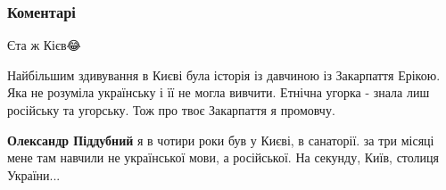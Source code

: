  
 
 
 
 
\subsubsection{Коментарі}
\label{sec:02_08_2021.fb.piddubnyj_aleksandr.1.dobryj_den_aleksandr.cmt}

\begin{itemize}
 
Єта ж Кієв😂

\begin{itemize}
 

Найбільшим здивування в Києві була історія із давчиною із Закарпаття Ерікою.
Яка не розуміла українську і її не могла вивчити. Етнічна угорка - знала лиш
російську та угорську. Тож про твоє Закарпаття я промовчу.


 
\textbf{Олександр Піддубний} я в чотири роки був у Києві, в санаторії. за три
місяці мене там навчили не української мови, а російської. На секунду, Київ,
столиця України...

 

\end{itemize}
\end{itemize}
